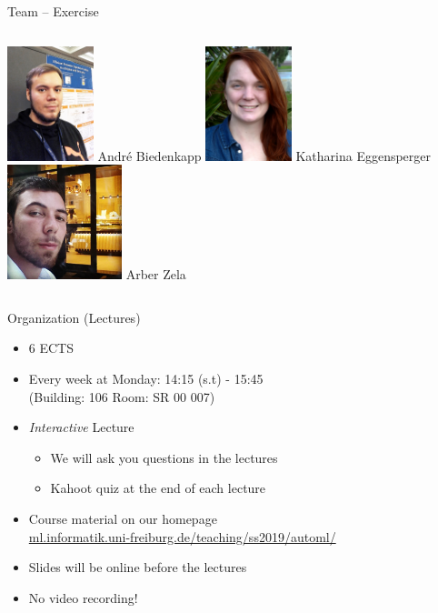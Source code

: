 \begin{frame}[c]{Team -- Exercise}

\begin{columns}[T]

\centering
\includegraphics[height=9em]{images/team/biedenkapp}
André Biedenkapp
\centering
\includegraphics[height=9em]{images/team/eggensperger_small}
Katharina Eggensperger
\centering
\includegraphics[height=9em]{images/team/arber_small}
Arber Zela

\end{columns}

\end{frame}
\begin{frame}[c]{Organization (Lectures)}

\begin{itemize}
  \item $6$ ECTS
  \item Every week at Monday: 14:15 (s.t) - 15:45\\ (Building: 106 Room: SR 00 007)
  \item \emph{Interactive} Lecture 
  \begin{itemize}
    \item We will ask you questions in the lectures
    \item Kahoot quiz at the end of each lecture
  \end{itemize}
  \item Course material on our homepage\\
  		{\small \url{ml.informatik.uni-freiburg.de/teaching/ss2019/automl/}}
  \item Slides will be online before the lectures
  \item No video recording!
\end{itemize}

\end{frame}
